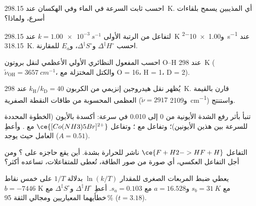 \begin{exercise}[$\star$]\label{exo:b3:rate-theories:4}
احسب ثابت السرعة  في الماء وفي الهكسان عند
\qty{298.15}{K}. أي المذيبين يسمح بلقاءات أسرع، ولماذا؟
\end{exercise}

\begin{exercise}[$\star\star$]\label{exo:b3:rate-theories:5}
لتفاعل من الرتبة الأولى $k = \qty{1.00e-3}{s^{-1}}$ عند \qty{298.15}{K} و\qty{1.00e-2}{s^{-1}} عند
\qty{318.15}{K}. احسب $\Delta^{\ddagger}H^\circ$ و$\Delta^{\ddagger}S^\circ$، و$E_a$ للمقارنة.
\end{exercise}

\begin{exercise}[$\star\star$]\label{exo:b3:rate-theories:6}
احسب المفعول النظائري الأولي الأعظمي لنقل بروتون O--H عند
\qty{298}{K} ($\tilde\nu_{\mathrm{OH}} = \qty{3657}{cm^{-1}}$، والكتل المختزلة مع O = 16، H = 1، D = 2).
\end{exercise}

\begin{exercise}[$\star\star$]\label{exo:b3:rate-theories:7}
يُظهر نقل هيدروجين إنزيمي من الكربون $k_{\mathrm H}/k_{\mathrm D} = 40$ عند \qty{298}{K}. قارن
بالقيمة العظمى المحسوبة من طاقات النقطة الصفرية ($\tilde\nu = 2917$ و\qty{2109}{cm^{-1}}) واستنتج.
\end{exercise}

\begin{exercise}[$\star\star$]\label{exo:b3:rate-theories:8}
تنبأ بأثر رفع الشدة الأيونية من 0 إلى 0.010 في سرعة: أكسدة 
بالأيون  (الخطوة المحددة للسرعة بين هذين الأيونين)؛ 
وتفاعل  مع ؛ وتفاعل $\ce{[Co(NH3)5Br]^{2+}}$ مع .
وأعطِ العامل حيث يوجد ($A = 0.51$).
\end{exercise}

\begin{exercise}[$\star\star$]\label{exo:b3:rate-theories:9}
التفاعل $\ce{F + H2 -> HF + H}$ ناشر للحرارة بشدة. أين يقع حاجزه على
؟ ومن أجل التفاعل العكسي، أي صورة من صور الطاقة، تُعطى
للمتفاعلات، تساعده أكثر؟
\end{exercise}

\begin{exercise}[$\star\star\star$]\label{exo:b3:rate-theories:10}
يعطي ضبط المربعات الصغرى للمقدار $\ln(k/T)$ بدلالة $1/T$ على خمس نقاط $b = -7446$ K
مع $s_b = \qty{31}{K}$ و$a = 16.528$ مع $s_a = 0.103$. أعطِ $\Delta^{\ddagger}H^\circ$ و$\Delta^{\ddagger}S^\circ$ مع
خطأيهما المعياريين ومجالي الثقة 95\,\% ($t = 3.18$).
\end{exercise}

